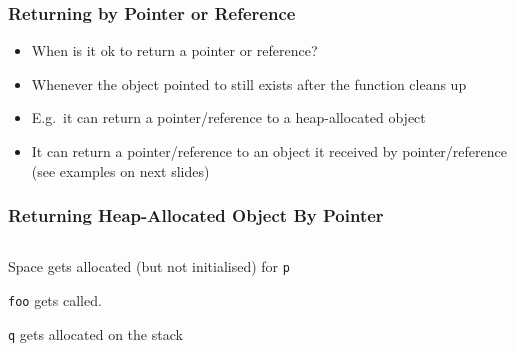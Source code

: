 \begin{frame}
  \frametitle{Returning by Pointer or Reference}
  \begin{itemize}
    \item When is it ok to return a pointer or reference?
    \item Whenever the object pointed to still exists after the function cleans up
    \item E.g.~it can return a pointer/reference to a heap-allocated object
    \item It can return a pointer/reference to an object
          it received by pointer/reference (see examples on next slides)
  \end{itemize}
\end{frame}

\begin{frame}
  \frametitle{Returning Heap-Allocated Object By Pointer}
  \begin{center}
    \begin{columns}
      \column{5cm}
      \column{4cm}
    \end{columns}
  \end{center}
  \vskip2mm
  \begin{overprint}
    \begin{center}
      Space gets allocated (but not initialised) for {\tt p}
    \end{center}

    \begin{center}
      {\tt foo} gets called.
    \end{center}

    \begin{center}
      {\tt q} gets allocated on the stack
    \end{center}


\end{overprint}
\end{frame}
